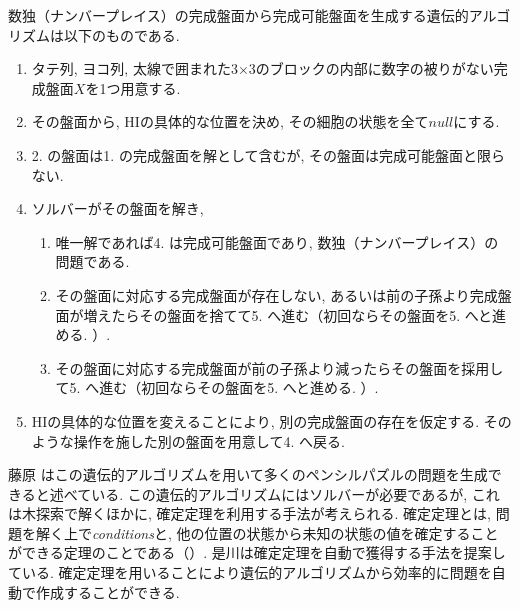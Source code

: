 \begin{example}[遺伝的アルゴリズム]
  数独（ナンバープレイス）の完成盤面から完成可能盤面を生成する遺伝的アルゴリズムは以下のものである.
  \begin{enumerate}
    \item タテ列, ヨコ列, 太線で囲まれた3$\times$3のブロックの内部に数字の被りがない完成盤面$X$を1つ用意する.
    \item その盤面から, HIの具体的な位置を決め, その細胞の状態を全て$null$にする.
    \item 2. の盤面は1. の完成盤面を解として含むが, その盤面は完成可能盤面と限らない.
    \item ソルバーがその盤面を解き,
          \begin{enumerate}
            \item 唯一解であれば4. は完成可能盤面であり, 数独（ナンバープレイス）の問題である.
            \item その盤面に対応する完成盤面が存在しない, あるいは前の子孫より完成盤面が増えたらその盤面を捨てて5. へ進む（初回ならその盤面を5. へと進める. ）.
            \item その盤面に対応する完成盤面が前の子孫より減ったらその盤面を採用して5. へ進む（初回ならその盤面を5. へと進める. ）.
          \end{enumerate}
    \item HIの具体的な位置を変えることにより, 別の完成盤面の存在を仮定する. そのような操作を施した別の盤面を用意して4. へ戻る.
  \end{enumerate}
\end{example}

藤原 \cite{Fujiwara2022}はこの遺伝的アルゴリズムを用いて多くのペンシルパズルの問題を生成できると述べている. この遺伝的アルゴリズムにはソルバーが必要であるが, これは木探索で解くほかに, 確定定理を利用する手法が考えられる. 確定定理とは, 問題を解く上で\textit{conditions}と, 他の位置の状態から未知の状態の値を確定することができる定理のことである（\cite{Korekawa2008}）. 是川\cite{Korekawa2008}は確定定理を自動で獲得する手法を提案している. 確定定理を用いることにより遺伝的アルゴリズムから効率的に問題を自動で作成することができる.
